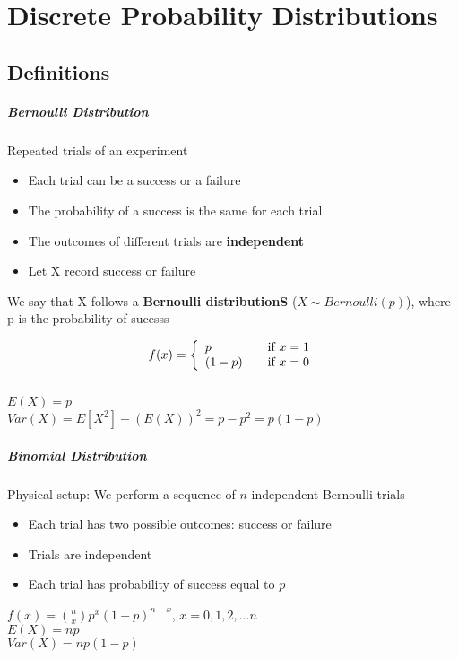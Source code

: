 \chapter{Discrete Probability Distributions}
  \section{Definitions}
    \paragraph{Bernoulli Distribution} Repeated trials of an experiment
    \begin{itemize}
      \item Each trial can be a success or a failure
      \item The probability of a success is the same for each trial
      \item The outcomes of different trials are \textbf{independent}
      \item Let X record success or failure
    \end{itemize}
    We say that X follows a \textbf{Bernoulli distributionS} ($X \sim
    Bernoulli(p)$), where p is the probability of sucesss

    \[ f(x) = \left\{
      \begin{array}{l l}
        p     & \quad \text{if $x = 1$}\\
        (1-p) & \quad \text{if $x = 0$}
      \end{array}
      \right.  \]\\
      $E(X) = p$\\
      $Var(X) = E[X^2] - (E(X))^2 = p - p^2 = p(1-p)$

    \paragraph{Binomial Distribution}
      Physical setup: We perform a sequence of $n$ independent Bernoulli trials
      \begin{itemize}
        \item Each trial has two possible outcomes: success or failure
        \item Trials are independent
        \item Each trial has probability of success equal to $p$
      \end{itemize}

      $f(x) = \binom{n}{x} p^x(1-p)^{n-x}$, $x = 0, 1, 2, ... n$\\
      $E(X) = np$\\
      $Var(X) = np(1-p)$

